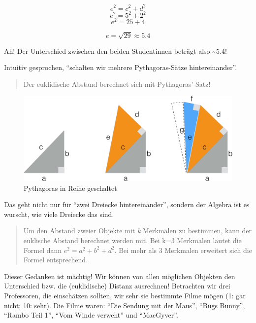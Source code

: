 \documentclass[12pt,ngerman,]{book}
\begin{document}
\[e^2 = c^2 + d^2\] \[e^2 = 5^2 + 2^2\] \[e^2 = 25 + 4\]

\[e = \sqrt{29} \approx 5.4\]

Ah! Der Unterschied zwischen den beiden Studentinnen beträgt also
\textasciitilde{}5.4!

Intuitiv gesprochen, ``schalten wir mehrere Pythagoras-Sätze
hintereinander''.

\begin{quote}
Der euklidische Abstand berechnet sich mit Pythagoras' Satz!
\end{quote}

\begin{figure}

{\centering \includegraphics[width=0.7\linewidth]{images/cluster/pythagoras_crop} 

}

\caption{Pythagoras in Reihe geschaltet}\label{fig:pythagoras}
\end{figure}

Das geht nicht nur für ``zwei Dreiecke hintereinander'', sondern der
Algebra ist es wurscht, wie viele Dreiecke das sind.

\begin{quote}
Um den Abstand zweier Objekte mit \emph{k} Merkmalen zu bestimmen, kann
der euklische Abstand berechnet werden mit. Bei k=3 Merkmalen lautet die
Formel dann \(e^2 = a^2 + b^2 + d^2\). Bei mehr als 3 Merkmalen
erweitert sich die Formel entsprechend.
\end{quote}

Dieser Gedanken ist mächtig! Wir können von allen möglichen Objekten den
Unterschied bzw. die (euklidische) Distanz ausrechnen! Betrachten wir
drei Professoren, die einschätzen sollten, wir sehr sie bestimmte Filme
mögen (1: gar nicht; 10: sehr). Die Filme waren: ``Die Sendung mit der
Maus'', ``Bugs Bunny'', ``Rambo Teil 1'', ``Vom Winde verweht'' und
``MacGyver''.
\end{document}
